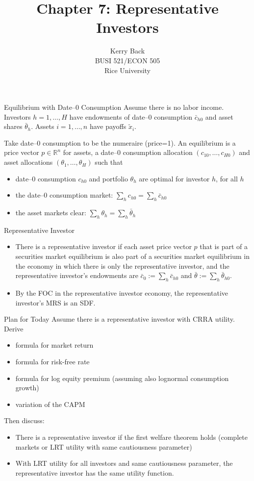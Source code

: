 \documentclass[10pt]{beamer}
\title{Chapter 7: Representative Investors}
\date{}
\author{Kerry Back\\ 
BUSI 521/ECON 505\\
Rice University}
\newcommand{\bi}{\begin{itemize}}
\newcommand{\ei}{\end{itemize}}
\newcommand{\im}{\item}
\newcommand{\myreal}{\ensuremath{\mathbb{R}}}
\newcommand{\tx}{\tilde{x}}
\begin{document}
\maketitle


\begin{frame}{Equilibrium with Date--0 Consumption}
Assume there is no labor income.
Investors $h=1,\ldots,H$ have endowments of date--0 consumption $\bar{c}_{h0}$ and asset shares $\bar{\theta}_h$.  Assets $i=1,\ldots,n$ have payoffs $\tx_i$.

Take date--0 consumption to be the numeraire (price=1).  An equilibrium is a price vector $p\in \myreal^n$ for assets, a date--0 consumption allocation $(c_{10},\ldots,c_{H0})$ and asset allocations $(\theta_1,\ldots,\theta_H)$ such that
\begin{itemize}
    \item date--0 consumption $c_{h0}$ and portfolio $\theta_h$ are optimal for investor $h$, for all $h$
    \item the date--0 consumption market: $\sum_h c_{h0} = \sum_h \bar{c}_{h0}$
    \item the asset markets clear: $\sum_h \theta_h = \sum_h\bar{\theta}_h$
\end{itemize}
\end{frame}

\begin{frame}{Representative Investor}
    \bi 
    \im There is a representative investor 
    if each asset price vector $p$ that is part of a securities market equilibrium is also part of a securities market equilibrium in the economy in which there is only the representative investor, and the representative investor's endowments are $\bar{c}_0 := \sum_h \bar{c}_{h0}$ and $\bar{\theta} := \sum_h \bar{\theta}_{h0}$.  
    
    \im By the FOC in the representative investor economy, the representative investor's MRS is an SDF.
    \ei
 \end{frame}
 
 \begin{frame}{Plan for Today}
     Assume there is a representative investor with CRRA utility.  Derive
     \begin{itemize}
         \item formula for market return 
         \item formula for risk-free rate
         \item formula for log equity premium (assuming also lognormal consumption growth)
         \item variation of the CAPM
     \end{itemize}
     
Then discuss:
\begin{itemize}
    \item There is a representative investor if the first welfare theorem holds (complete markets or LRT utility with same cautiousness parameter)
    \item With LRT utility for all investors and same cautiousness parameter, the representative investor has the same utility function.
\end{itemize}
 \end{frame}
\end{document}
